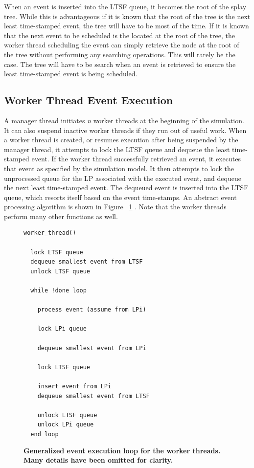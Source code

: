 \documentclass[11pt]{book}
\begin{document}
When an event is inserted into the LTSF queue, it becomes the root of the splay tree.
While this is advantageous if it is known that the root of the tree is the next least
time-stamped event, the tree will have to be most of the time.  If it is known that the
next event to be scheduled is the located at the root of the tree, the worker thread
scheduling the event can simply retrieve the node at the root of the tree without
performing any searching operations.  This will rarely be the case.  The tree will have to
be search when an event is retrieved to ensure the least time-stamped event is being
scheduled.

\subsection{Worker Thread Event Execution}

A manager thread initiates \emph{n} worker threads at the beginning of the simulation.  It
can also suspend inactive worker threads if they run out of useful work.  When a worker
thread is created, or resumes execution after being suspended by the manager thread, it
attempts to lock the LTSF queue and dequeue the least time-stamped event.  If the worker
thread successfully retrieved an event, it executes that event as specified by the
simulation model.  It then attempts to lock the unprocessed queue for the LP associated
with the executed event, and dequeue the next least time-stamped event.  The dequeued
event is inserted into the LTSF queue, which resorts itself based on the event
time-stamps.  An abstract event processing algorithm is shown in Figure
~\ref{workerThreadAlgorithm} \cite{dickman}.  Note that the worker threads perform many
other functions as well.

\begin{figure}
\begin{verbatim}
worker_thread()

  lock LTSF queue
  dequeue smallest event from LTSF
  unlock LTSF queue

  while !done loop

    process event (assume from LPi)

    lock LPi queue 

    dequeue smallest event from LPi

    lock LTSF queue

    insert event from LPi
    dequeue smallest event from LTSF

    unlock LTSF queue
    unlock LPi queue
  end loop
\end{verbatim}
\caption{\textbf{Generalized event execution loop for the worker threads.  Many details
    have been omitted for clarity.}}\label{workerThreadAlgorithm}
\end{figure}
\end{document}
